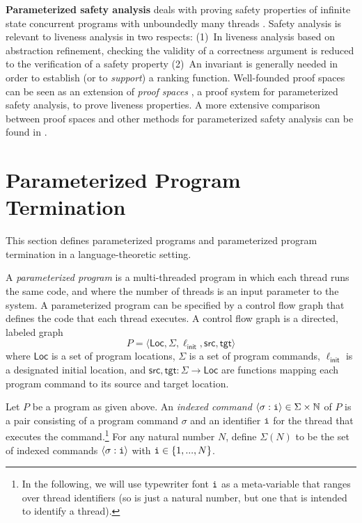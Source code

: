 \documentclass[9pt,nocopyrightspace]{sigplanconf}
\theoremstyle{definition}
\newcommand{\tuple}[1]{\langle #1 \rangle}
\newcommand{\Loc}{\textsf{Loc}}
\newcommand{\idx}[1]{\text{\rm\texttt{#1}}}
\newcommand{\ic}[2]{{\tuple{#1 : #2}}}
\newcommand{\src}{\textsf{src}}
\newcommand{\tgt}{\textsf{tgt}}
\newcommand{\init}{\textsf{init}}
\newcommand{\natsleq}[1]{\{1,...,#1\}}
\newcommand{\iSigma}[1]{\Sigma(#1)}
\begin{document}
\textbf{Parameterized safety analysis} deals with proving safety properties of
infinite state concurrent programs with unboundedly many threads
\cite{Kaiser2014,Sanchez2012,Jaffar2009,Segalov2009}.  Safety analysis is
relevant to liveness analysis in two respects: (1)~In liveness analysis based
on abstraction refinement, checking the validity of a correctness argument is
reduced to the verification of a safety property \cite{Cook2005,pldi/CookPR06}
(2)~An invariant is generally needed in order to establish (or to
\emph{support}) a ranking function.  
Well-founded proof spaces can be seen as an extension of \emph{proof spaces}
\cite{Farzan2015}, a proof system for parameterized safety analysis, to prove
liveness properties.  A more extensive comparison between proof spaces and
other methods for parameterized safety analysis can be found in
\cite{Farzan2015}.



\section{Parameterized Program Termination} \label{sec:prelim}

This section defines parameterized programs and parameterized program
termination in a language-theoretic setting.



A \emph{parameterized program} is a multi-threaded program in which each
thread runs the same code, and where the number of threads is an input
parameter to the system.  A parameterized program can be specified by a
control flow graph that defines the code that each thread
executes.
A control flow graph is a directed, labeled graph \[P
= \tuple{\Loc,\Sigma,\ell_\init,\src,\tgt}\] where $\Loc$ is a set of program
locations, $\Sigma$ is a set of program commands, $\ell_\init$ is a designated
initial location, and $\src,\tgt : \Sigma \rightarrow \Loc$ are functions
mapping each program command to its source and target location.

Let $P$ be a program as given above. 
An \emph{indexed command}
$\ic{\sigma}{\idx{i}} \in \Sigma \times \mathbb{N}$ of $P$ is a pair
consisting of a program command $\sigma$ and an identifier $\idx{i}$ for the
thread that executes the command.\footnote{In the following, we will use typewriter font $\idx{i}$ as a meta-variable that ranges over thread identifiers (so \idx{i} is just a natural number, but one that is intended to identify a thread).}  For any natural number $N$, define
$\iSigma{N}$ to be the set of indexed commands $\ic{\sigma}{\idx{i}}$ with
$\idx{i} \in \natsleq{N}$.
\end{document}
